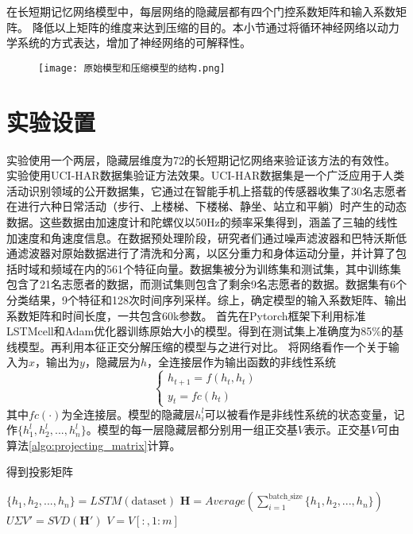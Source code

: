 在长短期记忆网络模型中，每层网络的隐藏层都有四个门控系数矩阵和输入系数矩阵。
降低以上矩阵的维度来达到压缩的目的。本小节通过将循环神经网络以动力学系统的方式表达，增加了神经网络的可解释性。

\begin{figure}[!htbp]
  \centering
  \texttt{[image: 原始模型和压缩模型的结构.png]}
  \label{fig:原始模型和压缩模型的结构}
\end{figure}
\section{实验设置}
实验使用一个两层，隐藏层维度为72的长短期记忆网络来验证该方法的有效性。
实验使用UCI-HAR数据集\cite{anguita2012human}验证方法效果。UCI-HAR数据集是一个广泛应用于人类活动识别领域的公开数据集，它通过在智能手机上搭载的传感器收集了30名志愿者在进行六种日常活动（步行、上楼梯、下楼梯、静坐、站立和平躺）时产生的动态数据。这些数据由加速度计和陀螺仪以50Hz的频率采集得到，涵盖了三轴的线性加速度和角速度信息。在数据预处理阶段，研究者们通过噪声滤波器和巴特沃斯低通滤波器对原始数据进行了清洗和分离，以区分重力和身体运动分量，并计算了包括时域和频域在内的561个特征向量。数据集被分为训练集和测试集，其中训练集包含了21名志愿者的数据，而测试集则包含了剩余9名志愿者的数据。数据集有6个分类结果，9个特征和128次时间序列采样。综上，确定模型的输入系数矩阵、输出系数矩阵和时间长度，一共包含60k参数。
首先在Pytorch框架下利用标准LSTMcell和Adam优化器训练原始大小的模型。得到在测试集上准确度为85\%的基线模型。再利用本征正交分解压缩的模型与之进行对比。
将网络看作一个关于输入为$x$，输出为$y$，隐藏层为$h$，全连接层作为输出函数的非线性系统
\begin{equation}
  \label{eq:22}
\left\{ \begin{array}{l}
  {h_{t + 1}} = f({h_t},{h_t})\\
  {y_t} = fc({h_t})
  \end{array} \right.
\end{equation}
其中$fc( \cdot )$为全连接层。模型的隐藏层$h_i^l$可以被看作是非线性系统的状态变量，记作$\{ h_1^l,h_2^l,...,h_n^l\}$。模型的每一层隐藏层都分别用一组正交基$V$表示。正交基$V$可由算法\ref{algo:projecting_matrix}计算。
\begin{algorithm}[!htbp]
  \caption{得到投影矩阵}
  \label{algo:projecting_matrix}
  \DontPrintSemicolon
  
  
  \vspace{5pt}
  
  $\{h_1, h_2, ..., h_n\} = LSTM(\text{dataset})$\;
  $\mathbf{H} = Average(\sum_{i=1}^{\text{batch\_size}} \{h_1, h_2, ..., h_n\})$\;
  $U \Sigma V' = SVD(\mathbf{H}')$\;
  $V = V[:, 1:m]$\;
  
\end{algorithm}

